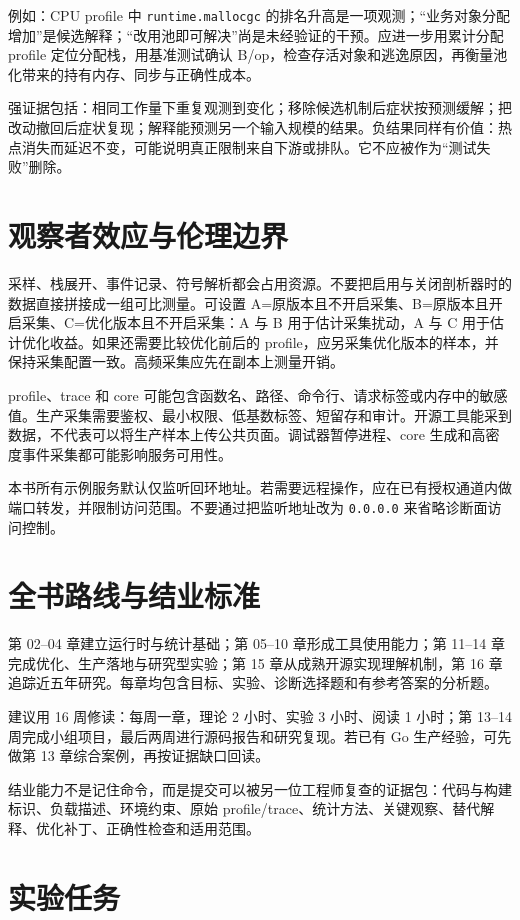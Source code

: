 \documentclass[UTF8,fontset=fandol,openany,11pt]{ctexbook}
\begin{document}
例如：CPU profile 中 \texttt{runtime.\allowbreak{}mallocgc} 的排名升高是一项观测；“业务对象分配增加”是候选解释；“改用池即可解决”尚是未经验证的干预。应进一步用累计分配 profile 定位分配栈，用基准测试确认 B/op，检查存活对象和逃逸原因，再衡量池化带来的持有内存、同步与正确性成本。

强证据包括：相同工作量下重复观测到变化；移除候选机制后症状按预测缓解；把改动撤回后症状复现；解释能预测另一个输入规模的结果。负结果同样有价值：热点消失而延迟不变，可能说明真正限制来自下游或排队。它不应被作为“测试失败”删除。

\section{观察者效应与伦理边界}
采样、栈展开、事件记录、符号解析都会占用资源。不要把启用与关闭剖析器时的数据直接拼接成一组可比测量。可设置 A=原版本且不开启采集、B=原版本且开启采集、C=优化版本且不开启采集：A 与 B 用于估计采集扰动，A 与 C 用于估计优化收益。如果还需要比较优化前后的 profile，应另采集优化版本的样本，并保持采集配置一致。高频采集应先在副本上测量开销。

profile、trace 和 core 可能包含函数名、路径、命令行、请求标签或内存中的敏感值。生产采集需要鉴权、最小权限、低基数标签、短留存和审计。开源工具能采到数据，不代表可以将生产样本上传公共页面。调试器暂停进程、core 生成和高密度事件采集都可能影响服务可用性。

本书所有示例服务默认仅监听回环地址。若需要远程操作，应在已有授权通道内做端口转发，并限制访问范围。不要通过把监听地址改为 \texttt{0.\allowbreak{}0.\allowbreak{}0.\allowbreak{}0} 来省略诊断面访问控制。

\section{全书路线与结业标准}
第 02–04 章建立运行时与统计基础；第 05–10 章形成工具使用能力；第 11–14 章完成优化、生产落地与研究型实验；第 15 章从成熟开源实现理解机制，第 16 章追踪近五年研究。每章均包含目标、实验、诊断选择题和有参考答案的分析题。

建议用 16 周修读：每周一章，理论 2 小时、实验 3 小时、阅读 1 小时；第 13–14 周完成小组项目，最后两周进行源码报告和研究复现。若已有 Go 生产经验，可先做第 13 章综合案例，再按证据缺口回读。

结业能力不是记住命令，而是提交可以被另一位工程师复查的证据包：代码与构建标识、负载描述、环境约束、原始 profile/trace、统计方法、关键观察、替代解释、优化补丁、正确性检查和适用范围。

\section{实验任务}
\end{document}
